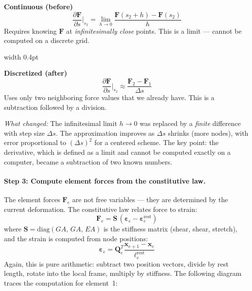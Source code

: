 \documentclass[11pt]{article}
\newcommand{\vect}[1]{\mathbf{#1}}
\newcommand{\mat}[1]{\mathbf{#1}}
\newcommand{\dds}[1]{\frac{\partial #1}{\partial s}}
\begin{document}
\begin{tcolorbox}[colback=white, colframe=black!40, title={\small Step 2 --- Continuous vs.\ discretized spatial derivative}, fonttitle=\bfseries\small]
\begin{minipage}[t]{0.47\linewidth}
\centering\textbf{Continuous (before)}
\[
  \dds{\vect{F}}\bigg|_{s_2} = \lim_{h \to 0} \frac{\vect{F}(s_2 + h) - \vect{F}(s_2)}{h}
\]
Requires knowing $\vect{F}$ at \emph{infinitesimally close} points.
This is a limit --- cannot be computed on a discrete grid.
\end{minipage}\hfill
\vrule width 0.4pt\hfill
\begin{minipage}[t]{0.47\linewidth}
\centering\textbf{Discretized (after)}
\[
  \dds{\vect{F}}\bigg|_{s_2} \approx \frac{\vect{F}_2 - \vect{F}_1}{\Delta s}
\]
Uses only two neighboring force values that we already have.
This is a subtraction followed by a division.
\end{minipage}

\smallskip
\noindent\textit{What changed:} The infinitesimal limit $h \to 0$ was replaced by a \emph{finite} difference with step size $\Delta s$.
The approximation improves as $\Delta s$ shrinks (more nodes), with error proportional to $(\Delta s)^2$ for a centered scheme.
The key point: the derivative, which is defined as a limit and cannot be computed exactly on a computer, became a subtraction of two known numbers.
\end{tcolorbox}

\paragraph{Step 3: Compute element forces from the constitutive law.}
The element forces $\vect{F}_e$ are not free variables --- they are determined by the current deformation.
The constitutive law relates force to strain:
\begin{equation}
  \vect{F}_e = \mat{S}\,(\bm{\varepsilon}_e - \bm{\varepsilon}_e^{\text{rest}})
  \label{eq:constitutive-example}
\end{equation}
where $\mat{S} = \mathrm{diag}(GA,\, GA,\, EA)$ is the stiffness matrix (shear, shear, stretch), and the strain is computed from node positions:
\begin{equation}
  \bm{\varepsilon}_e = \mat{Q}_e^T \frac{\vect{x}_{e+1} - \vect{x}_e}{\ell_e^{\text{rest}}}
  \label{eq:strain-example}
\end{equation}
Again, this is pure arithmetic: subtract two position vectors, divide by rest length, rotate into the local frame, multiply by stiffness.
The following diagram traces the computation for element~1:
\end{document}
